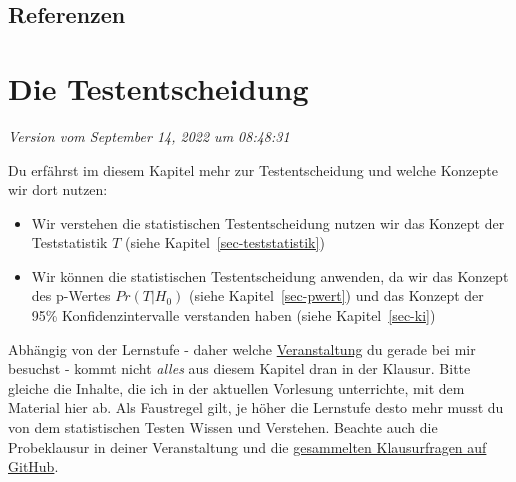 \documentclass[
  letterpaper,
]{scrbook}
\providecommand{\tightlist}{%
  \setlength{\itemsep}{0pt}\setlength{\parskip}{0pt}}\usepackage{longtable,booktabs,array}
\begin{document}
\hypertarget{referenzen-3}{%
\section*{Referenzen}\label{referenzen-3}}

\hypertarget{sec-stat-entscheidung}{%
\chapter{Die Testentscheidung}\label{sec-stat-entscheidung}}

\emph{Version vom September 14, 2022 um 08:48:31}

{}

Du erfährst im diesem Kapitel mehr zur Testentscheidung und welche
Konzepte wir dort nutzen:

\begin{itemize}
\tightlist
\item
  Wir verstehen die statistischen Testentscheidung nutzen wir das
  Konzept der Teststatistik \(T\) (siehe
  Kapitel~\ref{sec-teststatistik})
\item
  Wir können die statistischen Testentscheidung anwenden, da wir das
  Konzept des p-Wertes \(Pr(T|H_0)\) (siehe Kapitel~\ref{sec-pwert}) und
  das Konzept der 95\% Konfidenzintervalle verstanden haben (siehe
  Kapitel~\ref{sec-ki})
\end{itemize}

\begin{tcolorbox}[enhanced jigsaw, coltitle=black, titlerule=0mm, bottomrule=.15mm, opacityback=0, opacitybacktitle=0.6, leftrule=.75mm, title=\textcolor{quarto-callout-caution-color}{\faFire}\hspace{0.5em}{Ein Wort zur Klausur}, toprule=.15mm, bottomtitle=1mm, toptitle=1mm, left=2mm, breakable, arc=.35mm, colback=white, rightrule=.15mm, colbacktitle=quarto-callout-caution-color!10!white, colframe=quarto-callout-caution-color-frame]
Abhängig von der Lernstufe - daher welche
\protect\hyperlink{sec-vorlesungen-hs}{Veranstaltung} du gerade bei mir
besuchst - kommt nicht \emph{alles} aus diesem Kapitel dran in der
Klausur. Bitte gleiche die Inhalte, die ich in der aktuellen Vorlesung
unterrichte, mit dem Material hier ab. Als Faustregel gilt, je höher die
Lernstufe desto mehr musst du von dem statistischen Testen Wissen und
Verstehen. Beachte auch die Probeklausur in deiner Veranstaltung und die
\href{https://github.com/jkruppa/teaching/tree/main/Klausur}{gesammelten
Klausurfragen auf GitHub}.
\end{tcolorbox}
\end{document}
